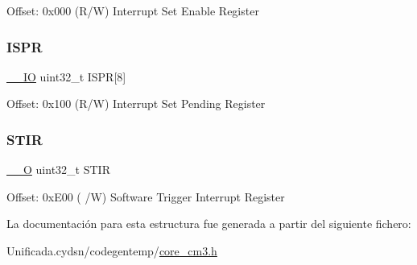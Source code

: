 Offset\+: 0x000 (R/W) Interrupt Set Enable Register \mbox{\label{struct_n_v_i_c___type_ab39acf254b485e3ad71b18aa9f1ca594}} 
\subsubsection{\texorpdfstring{I\+S\+PR}{ISPR}}
{\footnotesize\ttfamily \mbox{\hyperlink{core__cm3_8h_aec43007d9998a0a0e01faede4133d6be}{\+\_\+\+\_\+\+IO}} uint32\+\_\+t I\+S\+PR\mbox{[}8\mbox{]}}

Offset\+: 0x100 (R/W) Interrupt Set Pending Register \mbox{\label{struct_n_v_i_c___type_a471c399bb79454dcdfb342a31a5684ae}} 
\subsubsection{\texorpdfstring{S\+T\+IR}{STIR}}
{\footnotesize\ttfamily \mbox{\hyperlink{core__cm3_8h_a7e25d9380f9ef903923964322e71f2f6}{\+\_\+\+\_\+O}} uint32\+\_\+t S\+T\+IR}

Offset\+: 0x\+E00 ( /W) Software Trigger Interrupt Register 

La documentación para esta estructura fue generada a partir del siguiente fichero\+:\begin{DoxyCompactItemize}
\item 
Unificada.\+cydsn/codegentemp/\mbox{\hyperlink{core__cm3_8h}{core\+\_\+cm3.\+h}}\end{DoxyCompactItemize}
